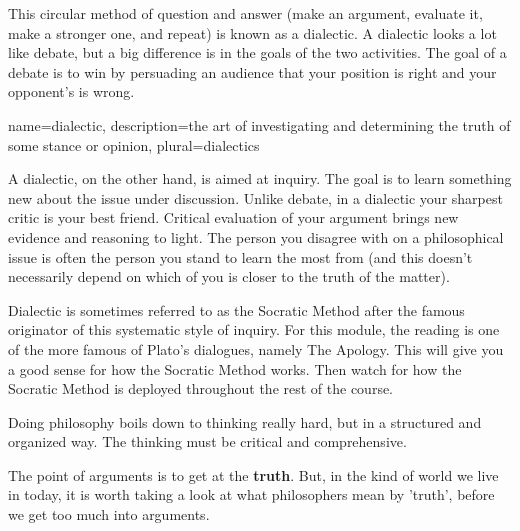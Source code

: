 This circular method of question and answer (make an argument, evaluate it, make a stronger one, and repeat) is known as a \gls{dialectic}. A dialectic looks a lot like debate, but a big difference is in the goals of the two activities. The goal of a debate is to win by persuading an audience that your position is right and your opponent’s is wrong.

{
name=dialectic,
description={the art of investigating and determining the truth of some stance or opinion},
plural=dialectics
}


A dialectic, on the other hand, is aimed at inquiry. The goal is to learn something new about the issue under discussion. Unlike debate, in a dialectic your sharpest critic is your best friend. Critical evaluation of your argument brings new evidence and reasoning to light. The person you disagree with on a philosophical issue is often the person you stand to learn the most from (and this doesn’t necessarily depend on which of you is closer to the truth of the matter).

Dialectic is sometimes referred to as the Socratic Method after the famous originator of this systematic style of inquiry. For this module, the reading is one of the more famous of Plato’s dialogues, namely The Apology. This will give you a good sense for how the Socratic Method works. Then watch for how the Socratic Method is deployed throughout the rest of the course.

Doing philosophy boils down to thinking really hard, but in a structured and organized way. The thinking must be critical and comprehensive.

The point of arguments is to get at the \textbf{truth}. But, in the kind of world we live in today, it is worth taking a look at what philosophers mean by 'truth', before we get too much into arguments.

